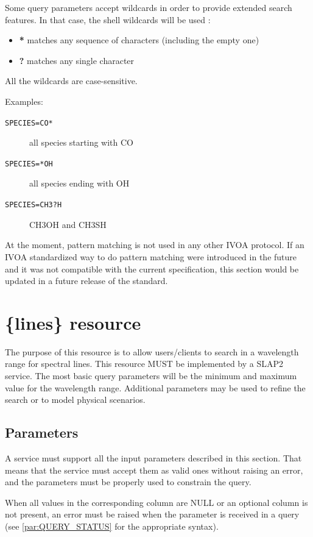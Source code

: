 \documentclass[11pt,a4paper]{ivoa}
\newcommand{\parexample}[1]{\noindent\quad\texttt{#1}}
\begin{document}
Some query parameters accept wildcards in order to provide extended search features.
In that case, the shell wildcards will be used :

\begin{itemize}
  \item \textbf{*} matches any sequence of characters (including the empty one)
  \item \textbf{?} matches any single character
\end{itemize}

All the wildcards are case-sensitive.

Examples:

\begin{description}
\item[\parexample{SPECIES=CO*}]  all species starting with CO
\item[\parexample{SPECIES=*OH}] all species ending with OH
\item[\parexample{SPECIES=CH3?H}] CH3OH and CH3SH
\end{description}

At the moment, pattern matching is not used in any other IVOA protocol. If an IVOA standardized
way to do pattern matching were introduced in the future and it was not compatible with
the current specification, this section would be updated in a future release of the standard.

\section{\{lines\} resource}
\label{sect:lines-res}

The purpose of this resource is to allow users/clients to search in a
wavelength range for spectral lines. This resource MUST be implemented
by a SLAP2 service. The most basic query parameters will be the minimum
and maximum value for the wavelength range. Additional parameters may be
used to refine the search or to model physical scenarios.

\subsection{Parameters}
\label{sect:lines-pars}

A service must support all the input parameters described in this section.
That means that the service must accept them as valid ones without
raising an error, and the parameters must be properly used to constrain
the query.

When all values in the corresponding column are NULL or an optional column is not present,
an error must be raised when the parameter is received in a query
(see \ref{par:QUERY_STATUS} for the appropriate syntax).
\end{document}
